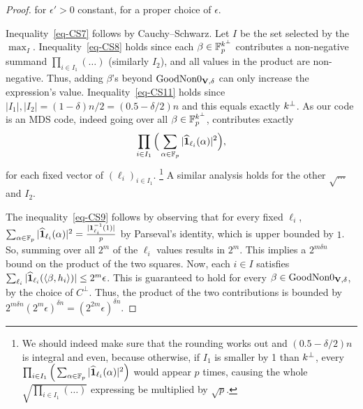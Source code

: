 \begin{proof}
for $\epsilon' > 0$ constant, for a proper choice of $\epsilon$.

Inequality~\ref{eq-CS7} follows by Cauchy–Schwarz.
Let $I$ be the set selected by the  $\max_I$.
Inequality~\ref{eq-CS8} holds since each $\beta\in \mathbb{F}^{k^\bot}_p$ contributes a non-negative summand $\prod_{i\in I_1}(\ldots)$ (similarly $I_2$), and all values in the product are non-negative. Thus, adding $\beta$'s beyond $\textnormal{GoodNon0}_{\mathbf{V},\delta}$ can only increase the expression's value.
Inequality~\ref{eq-CS11} holds since $|I_1|,|I_2|=(1-\delta)n/2=(0.5-\delta/2)n$ and this equals exactly $k^\bot$. As our code is an MDS code, indeed going over all $\beta\in \mathbb{F}^{k^\bot}_p$, contributes exactly 
$$ \prod_{i\in I_1}\Big(\sum_{\alpha\in\mathbb{F}_p}|\widehat{\mathbf{1}}_{\ell_i}(\alpha)|^2\Big),$$
for each fixed vector of $(\ell_i)_{i\in I_1}$. \footnote{We should indeed make sure that the rounding works out and $(0.5-\delta/2)n$ is integral and even, because otherwise, if $I_1$ is smaller by 1 than $k^\bot$, every $\prod_{i\in I_1}\Big(\sum_{\alpha\in\mathbb{F}_p}|\widehat{\mathbf{1}}_{\ell_i}(\alpha)|^2\Big)$ would appear $p$ times, causing the whole $\sqrt{\prod_{i\in I_1}(\ldots)}$ expressing be multiplied  by $\sqrt{p}$.}
A similar analysis holds for the other $\sqrt{\ldots}$ and $I_2$.

The inequality~\ref{eq-CS9} follows by observing that for every fixed $\ell_i$, $\sum_{\alpha\in\mathbb{F}_p}|\widehat{\mathbf{1}}_{\ell_i}(\alpha)|^2=\frac{|\mathbf{1}^{-1}_{\ell_i}(1)|}{p}$ by Parseval's identity, which is upper bounded by $1$. So, summing over all $2^m$ of the $\ell_i$ values results in $2^m$. This implies a $2^{m\delta n}$
bound on the product of the two squares. 
Now, each $i\in I$ satisfies $\sum_{\ell_i}|\widehat{\mathbf{1}}_{\ell_i}(\langle\beta,h_i\rangle)|\leq 2^m\epsilon$. This is guaranteed to hold for every $\beta\in \textnormal{GoodNon0}_{\mathbf{V},\delta}$, by the choice of $C^\bot$. Thus, the product of the two contributions is bounded by $2^{m\delta n}(2^m\epsilon)^{\delta n}=(2^{2m}\epsilon)^{\delta n}$.


\end{proof}
